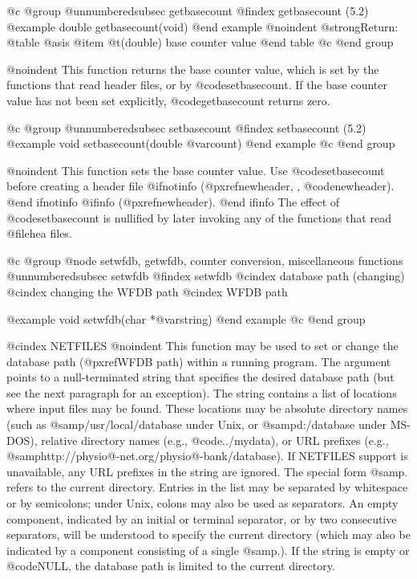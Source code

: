 {{{{{{{{@c @group
@unnumberedsubsec getbasecount
@findex getbasecount (5.2)
@example
double getbasecount(void)
@end example
@noindent
@strong{Return:}
@table @asis
@item @t{(double)}
base counter value
@end table
@c @end group

@noindent
This function returns the base counter value, which is set by the
functions that read header files, or by @code{setbasecount}.
If the base counter value has not been set explicitly,
@code{getbasecount} returns zero.

@c @group
@unnumberedsubsec setbasecount
@findex setbasecount (5.2)
@example
void setbasecount(double @var{count})
@end example
@c @end group

@noindent
This function sets the base counter value.  Use @code{setbasecount}
before creating a header file
@ifnotinfo
(@pxref{newheader, , @code{newheader}}).
@end ifnotinfo
@ifinfo
(@pxref{newheader}).
@end ifinfo
The effect of @code{setbasecount} is nullified by later invoking any of the
functions that read @file{hea} files.

@c @group
@node     setwfdb, getwfdb, counter conversion, miscellaneous functions
@unnumberedsubsec setwfdb
@findex setwfdb
@cindex database path (changing)
@cindex changing the WFDB path
@cindex WFDB path

@example
void setwfdb(char *@var{string})
@end example
@c @end group

@cindex NETFILES
@noindent
This function may be used to set or change the database path
(@pxref{WFDB path}) within a running program.  The argument points to a
null-terminated string that specifies the desired database path (but see
the next paragraph for an exception).  The string contains a list of
locations where input files may be found.  These locations may be
absolute directory names (such as @samp{/usr/local/database} under Unix,
or @samp{d:/database} under MS-DOS), relative directory names (e.g.,
@code{../mydata}), or URL prefixes (e.g.,
@samp{http://physio@-net.org/physio@-bank/database}).  If NETFILES
support is unavailable, any URL prefixes in the string are ignored.  The
special form @samp{.} refers to the current directory.  Entries in the
list may be separated by whitespace or by semicolons; under Unix, colons
may also be used as separators.  An empty component, indicated by an
initial or terminal separator, or by two consecutive separators, will be
understood to specify the current directory (which may also be indicated
by a component consisting of a single @samp{.}).  If the string is empty or
@code{NULL}, the database path is limited to the current directory.

}}}}}}}}
